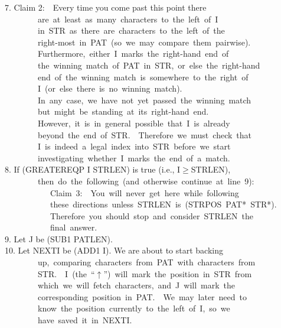 \documentclass[10pt]{book}
\newenvironment{pubasis}{\begin{flushleft}}{\end{flushleft}}
\begin{document}
\begin{pubasis}
7.	Claim 2:~~Every time you come past this point there\\
~~~~~~~~are~at~least~as~many~characters~to~the~left~of~I\\
~~~~~~~~in~STR~as~there~are~characters~to~the~left~of~the\\
~~~~~~~~right-most~in~PAT~(so~we~may~compare~them~pairwise).\\
~~~~~~~~Furthermore,~either~I~marks~the~right-hand~end~of\\
~~~~~~~~the~winning~match~of~PAT~in~STR,~or~else~the~right-hand\\
~~~~~~~~end~of~the~winning~match~is~somewhere~to~the~right~of\\
~~~~~~~~I~(or~else~there~is~no~winning~match).\\
~~~~~~~~In~any~case,~we~have~not~yet~passed~the~winning~match\\
~~~~~~~~but~might~be~standing~at~its~right-hand~end.\\

~~~~~~~~However,~it~is~in~general~possible~that~I~is~already\\
~~~~~~~~beyond~the~end~of~STR.~~Therefore~we~must~check~that\\
~~~~~~~~I~is~indeed~a~legal~index~into~STR~before~we~start\\
~~~~~~~~investigating~whether~I~marks~the~end~of~a~match.\\

8.	If (GREATEREQP I STRLEN) is true (i.e., I$\geq$STRLEN),\\
~~~~~~~~then~do~the~following~(and~otherwise~continue~at~line~9):\\

~~~~~~~~~~~Claim~3:~~You~will~never~get~here~while~following\\
~~~~~~~~~~~these~directions~unless~STRLEN~is~(STRPOS~PAT*~STR*).\\

~~~~~~~~~~~Therefore~you~should~stop~and~consider~STRLEN~the\\
~~~~~~~~~~~final~answer.\\

9.	Let J be (SUB1 PATLEN).\\

10.	Let NEXTI be (ADD1 I).  We are about to start backing\\
~~~~~~~~up,~comparing~characters~from~PAT~with~characters~from\\
~~~~~~~~STR.~~I~(the~``$\uparrow$'')~will~mark~the~position~in~STR~from\\
~~~~~~~~which~we~will~fetch~characters,~and~J~will~mark~the\\
~~~~~~~~corresponding~position~in~PAT.~~We~may~later~need~to~\\
~~~~~~~~know~the~position~currently~to~the~left~of~I,~so~we\\
~~~~~~~~have~saved~it~in~NEXTI.\\


\end{pubasis}
\end{document}
